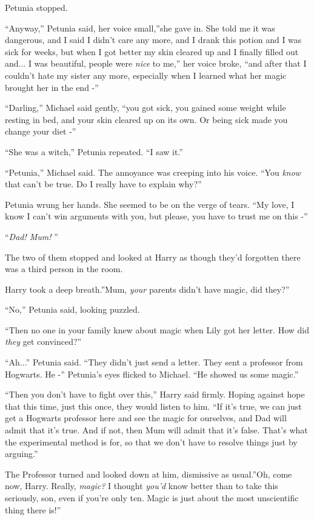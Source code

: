 Petunia stopped.

``Anyway,'' Petunia said, her voice small,''she gave in. She told me it
was dangerous, and I said I didn't care any more, and I drank this
potion and I was sick for weeks, but when I got better my skin cleared
up and I finally filled out and... I was beautiful, people were
\emph{nice} to me,'' her voice broke, ``and after that I couldn't hate
my sister any more, especially when I learned what her magic brought her
in the end -''

``Darling,'' Michael said gently, ``you got sick, you gained some weight
while resting in bed, and your skin cleared up on its own. Or being sick
made you change your diet -''

``She was a witch,'' Petunia repeated. ``I saw it.''

``Petunia,'' Michael said. The annoyance was creeping into his voice.
``You \emph{know} that can't be true. Do I really have to explain why?''

Petunia wrung her hands. She seemed to be on the verge of tears. ``My
love, I know I can't win arguments with you, but please, you have to
trust me on this -''

``\emph{Dad! Mum!} ''

The two of them stopped and looked at Harry as though they'd forgotten
there was a third person in the room.

Harry took a deep breath.''Mum, \emph{your} parents didn't have magic,
did they?''

``No,'' Petunia said, looking puzzled.

``Then no one in your family knew about magic when Lily got her letter.
How did \emph{they} get convinced?''

``Ah...'' Petunia said. ``They didn't just send a letter. They sent
a professor from Hogwarts. He -'' Petunia's eyes flicked to Michael.
``He showed us some magic.''

``Then you don't have to fight over this,'' Harry said firmly. Hoping
against hope that this time, just this once, they would listen to him.
``If it's true, we can just get a Hogwarts professor here and see the
magic for ourselves, and Dad will admit that it's true. And if not, then
Mum will admit that it's false. That's what the experimental method is
for, so that we don't have to resolve things just by arguing.''

The Professor turned and looked down at him, dismissive as usual.''Oh,
come now, Harry. Really, \emph{magic?} I thought \emph{you'd} know
better than to take this seriously, son, even if you're only ten. Magic
is just about the most unscientific thing there is!''

